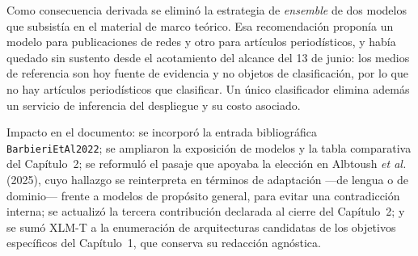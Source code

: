 Como consecuencia derivada se eliminó la estrategia de \textit{ensemble} de dos modelos que subsistía en el material de marco teórico. Esa recomendación proponía un modelo para publicaciones de redes y otro para artículos periodísticos, y había quedado sin sustento desde el acotamiento del alcance del 13 de junio: los medios de referencia son hoy fuente de evidencia y no objetos de clasificación, por lo que no hay artículos periodísticos que clasificar. Un único clasificador elimina además un servicio de inferencia del despliegue y su costo asociado.

Impacto en el documento: se incorporó la entrada bibliográfica \texttt{BarbieriEtAl2022}; se ampliaron la exposición de modelos y la tabla comparativa del Capítulo~2; se reformuló el pasaje que apoyaba la elección en Albtoush \textit{et al.} (2025), cuyo hallazgo se reinterpreta en términos de adaptación —de lengua o de dominio— frente a modelos de propósito general, para evitar una contradicción interna; se actualizó la tercera contribución declarada al cierre del Capítulo~2; y se sumó XLM-T a la enumeración de arquitecturas candidatas de los objetivos específicos del Capítulo~1, que conserva su redacción agnóstica.
